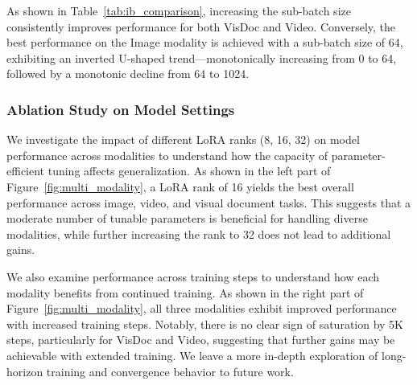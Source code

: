 As shown in Table~\ref{tab:ib_comparison}, increasing the sub-batch size consistently improves performance for both VisDoc and Video. Conversely, the best performance on the Image modality is achieved with a sub-batch size of 64, exhibiting an inverted U-shaped trend—monotonically increasing from 0 to 64, followed by a monotonic decline from 64 to 1024.
\begin{table}[ht]
\centering
{}
\caption{Performance comparison across different homogeneous sub-batch size for different modalities.}
\vspace{-3px}
\label{tab:ib_comparison}
\end{table}

\subsubsection{Ablation Study on Model Settings}
We investigate the impact of different LoRA ranks (8, 16, 32) on model performance across modalities to understand how the capacity of parameter-efficient tuning affects generalization. As shown in the left part of Figure~\ref{fig:multi_modality}, a LoRA rank of 16 yields the best overall performance across image, video, and visual document tasks. This suggests that a moderate number of tunable parameters is beneficial for handling diverse modalities, while further increasing the rank to 32 does not lead to additional gains.

We also examine performance across training steps to understand how each modality benefits from continued training. As shown in the right part of Figure~\ref{fig:multi_modality}, all three modalities exhibit improved performance with increased training steps. Notably, there is no clear sign of saturation by 5K steps, particularly for VisDoc and Video, suggesting that further gains may be achievable with extended training. We leave a more in-depth exploration of long-horizon training and convergence behavior to future work.

